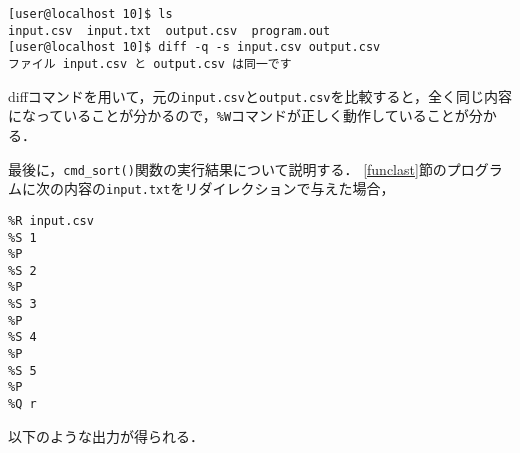 {\fontsize{10pt}{11pt} \selectfont
 \begin{verbatim}
[user@localhost 10]$ ls
input.csv  input.txt  output.csv  program.out
[user@localhost 10]$ diff -q -s input.csv output.csv
ファイル input.csv と output.csv は同一です
 \end{verbatim}
}

diffコマンドを用いて，元の\verb|input.csv|と\verb|output.csv|を比較すると，全く同じ内容になっていることが分かるので，\verb|%W|コマンドが正しく動作していることが分かる．

最後に，\verb|cmd_sort()|関数の実行結果について説明する．
\ref{funclast}節のプログラムに次の内容の\verb|input.txt|をリダイレクションで与えた場合，

{\fontsize{10pt}{11pt} \selectfont
 \begin{verbatim}
%R input.csv
%S 1
%P
%S 2
%P
%S 3
%P
%S 4
%P
%S 5
%P
%Q r
 \end{verbatim}
}

\noindent %
以下のような出力が得られる．

